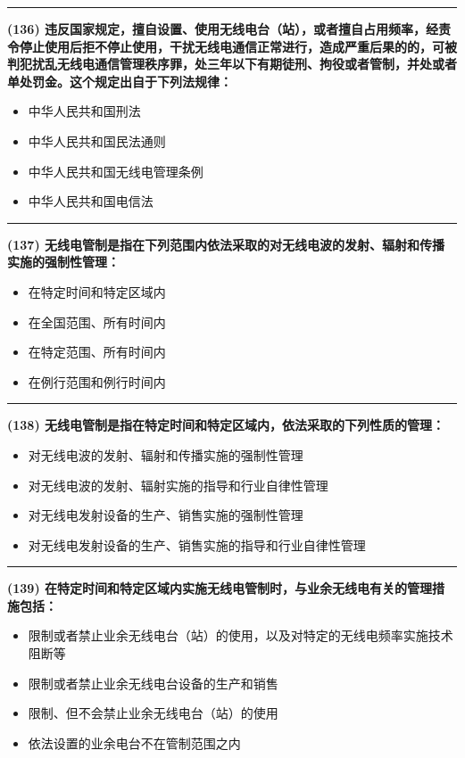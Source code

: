 \documentclass[twocolumn]{ctexart}  %
\begin{document}
\noindent\rule{0.5\textwidth}{1pt}
\heiti \textbf{(136) 违反国家规定，擅自设置、使用无线电台（站），或者擅自占用频率，经责令停止使用后拒不停止使用，干扰无线电通信正常进行，造成严重后果的的，可被判犯扰乱无线电通信管理秩序罪，处三年以下有期徒刑、拘役或者管制，并处或者单处罚金。这个规定出自于下列法规律：} \songti {\color{gray} [LK0103] }
\begin{itemize}
	\item  中华人民共和国刑法
	\item  中华人民共和国民法通则
	\item  中华人民共和国无线电管理条例
	\item  中华人民共和国电信法
\end{itemize}


\noindent\rule{0.5\textwidth}{1pt}
\heiti \textbf{(137) 无线电管制是指在下列范围内依法采取的对无线电波的发射、辐射和传播实施的强制性管理：} \songti {\color{gray} [LK0105] }
\begin{itemize}
	\item  在特定时间和特定区域内
	\item  在全国范围、所有时间内
	\item  在特定范围、所有时间内
	\item  在例行范围和例行时间内
\end{itemize}


\noindent\rule{0.5\textwidth}{1pt}
\heiti \textbf{(138) 无线电管制是指在特定时间和特定区域内，依法采取的下列性质的管理：} \songti {\color{gray} [LK0106] }
\begin{itemize}
	\item  对无线电波的发射、辐射和传播实施的强制性管理
	\item  对无线电波的发射、辐射实施的指导和行业自律性管理
	\item  对无线电发射设备的生产、销售实施的强制性管理
	\item  对无线电发射设备的生产、销售实施的指导和行业自律性管理
\end{itemize}


\noindent\rule{0.5\textwidth}{1pt}
\heiti \textbf{(139) 在特定时间和特定区域内实施无线电管制时，与业余无线电有关的管理措施包括：} \songti {\color{gray} [LK0107] }
\begin{itemize}
	\item  限制或者禁止业余无线电台（站）的使用，以及对特定的无线电频率实施技术阻断等
	\item  限制或者禁止业余无线电台设备的生产和销售
	\item  限制、但不会禁止业余无线电台（站）的使用
	\item  依法设置的业余电台不在管制范围之内
\end{itemize}
\end{document}

